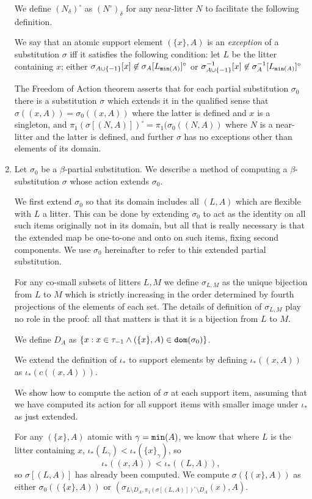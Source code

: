 \documentclass[12pt]{article}
\begin{document}
\begin{enumerate}
We define $(N_\delta)^\circ$ as $(N^\circ)_\delta$ for any near-litter $N$ to facilitate the following definition.

 We say that an atomic support element $(\{x\},A)$ is an {\em exception\/} of a substitution $\sigma$ iff it satisfies the following condition:
let $L$ be the litter containing $x$; either $\sigma_{A \cup \{-1\}}[x] \not\in \sigma_A[L_{{\tt min}(A)}]^\circ$ or $\sigma^{-1}_{A \cup \{-1\}}[x] \not\in \sigma^{-1}_A[L_{{\tt min}(A)}]^\circ$

The Freedom of Action theorem asserts that for each partial substitution $\sigma_0$  there is a substitution $\sigma$ which extends it in the qualified sense that $\sigma((x,A)) =\sigma_0((x,A))$ where the latter is defined and $x$ is a singleton, and $\pi_1(\sigma[(N,A)])^\circ = \pi_1(\sigma_0((N,A))$ where $N$ is a near-litter and the latter is defined, and further $\sigma$ has no exceptions other than elements of its domain.

\item  Let $\sigma_0$ be a $\beta$-partial substitution.  We describe a method of computing a $\beta$-substitution $\sigma$ whose action extends $\sigma_0$.

We first extend $\sigma_0$ so that its domain includes all $(L,A)$ which are flexible with $L$ a litter.  This can be done by extending $\sigma_0$ to act as the identity on all such items originally not in its domain, but all that is really necessary is that the extended map be one-to-one and onto on such items, fixing second components.  We use $\sigma_0$ hereinafter to refer to this extended partial substitution.

For any co-small subsets of litters $L,M$ we define $\sigma_{L,M}$ as the unique bijection from $L$ to $M$ which is strictly increasing in the order determined by fourth projections of the elements of each set.  The details of definition of $\sigma_{L,M}$ play no role in the proof: all that matters is that it is a bijection from $L$ to $M$.

We define $D_A$ as $\{x:x \in \tau_{-1} \wedge (\{x\},A) \in {\tt dom}(\sigma_0)\}$.

We extend the definition of $\iota_*$ to support elements by defining $\iota_*((x,A))$ as $\iota_*(c((x,A)))$.

We show how to compute the action of $\sigma$ at each support item, assuming that we have computed its action for all support items with smaller image under $\iota_*$ as just extended.

For any $(\{x\},A)$ atomic with $\gamma={\tt min}(A)$, we know that where $L$ is the litter containing $x$, $\iota_*(L_\gamma)<\iota_*(\{x\}_\gamma)$, so $$\iota_*((x,A))<\iota_*((L,A )),$$ so $\sigma[(L,A)]$ has already been computed.  We compute $\sigma(\{(x\},A))$ as either $\sigma_0((\{x\},A))$ or $(\sigma_{L\setminus D_A,\pi_1(\sigma[(L,A)])^\circ\setminus D_A}(x),A)$.


\end{enumerate}
\end{document}
